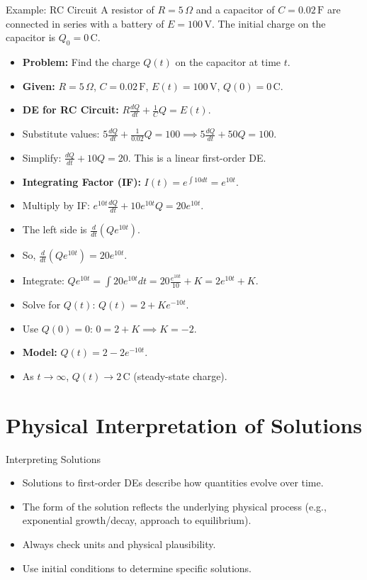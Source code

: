 \documentclass[10pt,aspectratio=169]{beamer}
\begin{document}
\begin{frame}{Example: RC Circuit}
    A resistor of $R=5\,\Omega$ and a capacitor of $C=0.02\,\mathrm{F}$ are connected in series with a battery of $E=100\,\mathrm{V}$. The initial charge on the capacitor is $Q_0 = 0\,\mathrm{C}$.
    \begin{itemize}
        \item \textbf{Problem:} Find the charge $Q(t)$ on the capacitor at time $t$.
        \item \textbf{Given:} $R=5\,\Omega$, $C=0.02\,\mathrm{F}$, $E(t)=100\,\mathrm{V}$, $Q(0)=0\,\mathrm{C}$.
        \item \textbf{DE for RC Circuit:} $R\frac{dQ}{dt} + \frac{1}{C}Q = E(t)$.
        \item Substitute values: $5\frac{dQ}{dt} + \frac{1}{0.02}Q = 100 \implies 5\frac{dQ}{dt} + 50Q = 100$.
        \item Simplify: $\frac{dQ}{dt} + 10Q = 20$. This is a linear first-order DE.
        \item \textbf{Integrating Factor (IF):} $I(t) = e^{\int 10 dt} = e^{10t}$.
        \item Multiply by IF: $e^{10t}\frac{dQ}{dt} + 10e^{10t}Q = 20e^{10t}$.
        \item The left side is $\frac{d}{dt}(Qe^{10t})$.
        \item So, $\frac{d}{dt}(Qe^{10t}) = 20e^{10t}$.
        \item Integrate: $Qe^{10t} = \int 20e^{10t} dt = 20 \frac{e^{10t}}{10} + K = 2e^{10t} + K$.
        \item Solve for $Q(t)$: $Q(t) = 2 + Ke^{-10t}$.
        \item Use $Q(0)=0$: $0 = 2 + K \implies K = -2$.
        \item \textbf{Model:} $Q(t) = 2 - 2e^{-10t}$.
        \item As $t \to \infty$, $Q(t) \to 2\,\mathrm{C}$ (steady-state charge).
    \end{itemize}
\end{frame}

\section{Physical Interpretation of Solutions}
\begin{frame}{Interpreting Solutions}
    \begin{itemize}
        \item Solutions to first-order DEs describe how quantities evolve over time.
        \item The form of the solution reflects the underlying physical process (e.g., exponential growth/decay, approach to equilibrium).
        \item Always check units and physical plausibility.
        \item Use initial conditions to determine specific solutions.
    \end{itemize}
\end{frame}
\end{document}
